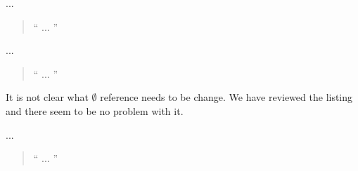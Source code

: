 \documentclass{response}
\begin{document}
\begin{comment}{Reviewer \#1}
- Proof of fairness properties. In order to deal with fairness properties
you advocate a strong fairness assumption. From my point a view, this
is a strong operating assumption. May be you could comment on that?
Last, but may be I am wrong, I have the intuition that weak fairness
for the events handling dequeuing external triggers would be enough?
Please could you comment?
\end{comment}

\begin{response}
  ...
  \begin{quote}
    `` ...
   ''
  \end{quote}
\end{response}

\begin{comment}{Reviewer \#1}
• p.2 The three rules are not at the same level. The first ones are expressed 
explicitely in terms of Event-B refinement features, while the third one 
addresses statecharts.
\end{comment}

\begin{response}
  ...
  \begin{quote}
    `` ...
   ''
  \end{quote}
\end{response}


\begin{comment}{Reviewer \#1}
• p. 10 typo? listing 3 l. 10 \emptyset
\end{comment}

\begin{response}
  It is not clear what $\emptyset$ reference needs to be change. We have reviewed the listing and there seem to be no problem with it.
\end{response}

\begin{comment}{Reviewer \#1}
• p.13 Could you illustrate the sentence all possible combinations of each
set of transitions that can fire together are calculated and corresponding
events are generated, at appropriate refinement levels.
\end{comment}

\begin{response}
  ...
  \begin{quote}
    `` ...
   ''
  \end{quote}
\end{response}
\end{document}
